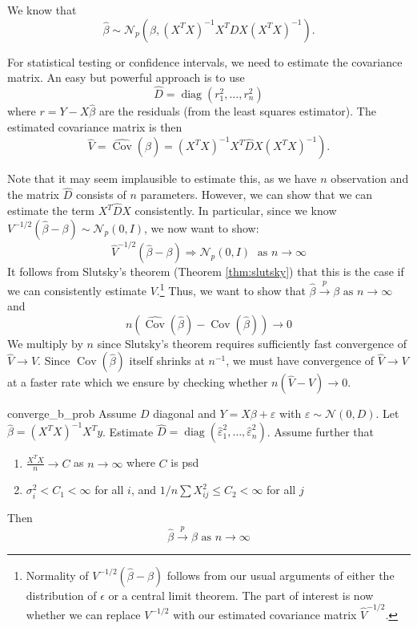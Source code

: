 \documentclass[11pt, %
	oneside, %
	english, %
	onehalfspacing, %
	]{article} %
\numberwithin{equation}{section}
\begin{document}
We know that
$$
\hat{\beta} \sim \mathcal{N}_p\left(\beta,\left(X^T X\right)^{-1} X^T D X\left(X^T X\right)^{-1}\right).
$$

For statistical testing or confidence intervals, we need to estimate the covariance matrix. An easy but powerful approach is to use
$$
\hat{D}=\operatorname{diag}\left(r_1^2, \ldots, r_n^2\right)
$$
where $r=Y-X \hat{\beta}$ are the residuals (from the least squares estimator). The estimated covariance matrix is then
$$
\hat{V} = \left.\widehat{\operatorname{Cov}}(\hat{\beta})=\left(X^T X\right)^{-1} X^T \hat{D} X\left(X^T X\right)^{-1}\right) .
$$

Note that it may seem implausible to estimate this, as we have $n$ observation and the matrix $\hat{D}$ consists of $n$ parameters. However, we can show that we can estimate the term $X^T \hat{D} X$ consistently. In particular, since we know $V^{-1 / 2}(\hat{\beta}-\beta) \sim \mathcal{N}_p(0, I)$, we now want to show:
\begin{equation*}
    \hat{V}^{-1 / 2}(\hat{\beta}-\beta) \Longrightarrow \mathcal{N}_p(0, I) \; \text{ as }n \rightarrow \infty
\end{equation*}
It follows from Slutsky's theorem (Theorem \ref{thm:slutsky}) that this is the case if we can consistently estimate $V$.\footnote{Normality of $V^{-1 / 2}(\hat{\beta}-\beta)$ follows from our usual arguments of either the distribution of $\epsilon$ or a central limit theorem. The part of interest is now whether we can replace $V^{-1 / 2}$ with our estimated covariance matrix $\hat{V}^{-1 / 2}$.}  Thus, we want to show that $\hat{\beta} \overset{p}{\to} \beta \text{ as } n \to \infty$ and
\begin{equation}\label{eq:51}
    n(\widehat{\operatorname{Cov}}(\hat{\beta})-\operatorname{Cov}(\hat{\beta})) \rightarrow 0
\end{equation}
We multiply by $n$ since Slutsky's theorem requires sufficiently fast convergence of $\hat{V} \to V$. Since $\operatorname{Cov}(\hat{\beta})$ itself shrinks at $n^{-1}$, we must have convergence of $\hat{V} \to V$ at a faster rate which we ensure by checking whether $n(\hat{V}  -V) \to 0$.


\begin{lemma}{}{converge_b_prob}
    Assume $D$ diagonal and $Y = X \beta + \varepsilon$ with $\varepsilon \sim \mathcal{N}(0, D)$. Let $\hat{\beta} = (X^T X)^{-1} X^T y$. Estimate $\hat{D} = \operatorname{diag}(\hat{\varepsilon}_1^2, \ldots, \hat{\varepsilon}_n^2)$. Assume further that
    \begin{enumerate}
        \item $ \frac{X^T X}{n} \to C$ as $n \to \infty$ where $C$ is psd
        \item $\sigma^2_i < C_1 < \infty$ for all $i$, and $1/n \sum X_{ij}^2 \leq C_2 < \infty$ for all $j$
    \end{enumerate}

    Then
    \begin{equation*}
        \hat{\beta} \overset{p}{\to} \beta \text{ as } n \to \infty
    \end{equation*}
\end{lemma}
\end{document}
